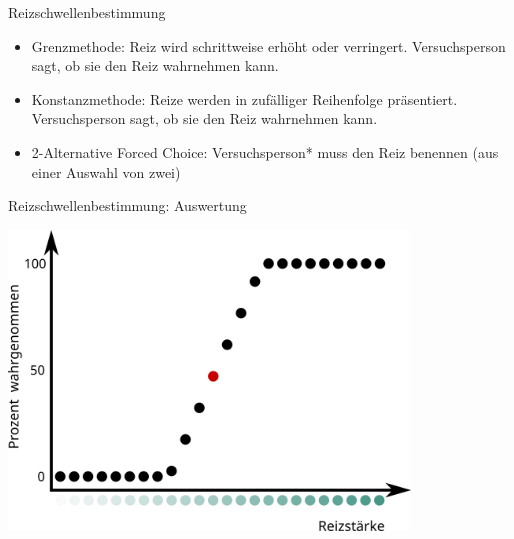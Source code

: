 \documentclass[aspectratio=169]{beamer}
\begin{document}


\begin{frame}{Reizschwellenbestimmung}

\begin{itemize}
    \item 
    Grenzmethode: Reiz wird schrittweise erhöht oder verringert. Versuchsperson sagt, ob sie den Reiz wahrnehmen kann.
    \item
    Konstanzmethode: Reize werden in zufälliger Reihenfolge präsentiert. Versuchsperson sagt, ob sie den Reiz wahrnehmen kann.
    \item
    2-Alternative Forced Choice: Versuchsperson* muss den Reiz benennen (aus einer Auswahl von zwei) 
\end{itemize}

\end{frame}





\begin{frame}{Reizschwellenbestimmung: Auswertung}

\begin{center}
    \includegraphics[width=0.8\textwidth]{reizschwellen_diagramm.png}
\end{center}

\end{frame}


\end{document}

